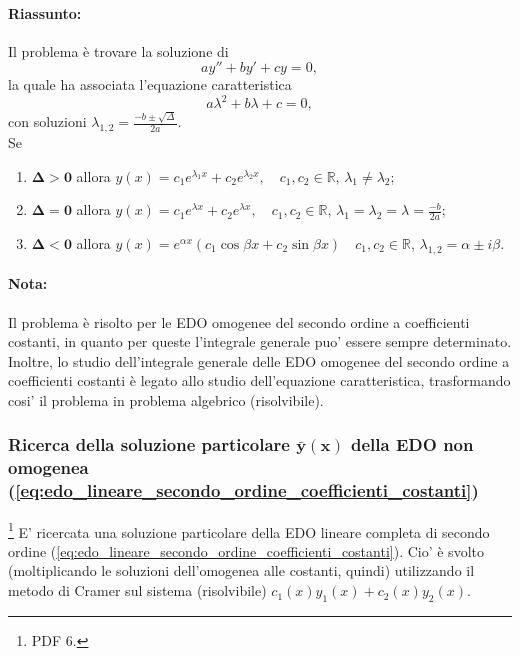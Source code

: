 \paragraph{Riassunto:} Il problema è trovare la soluzione di
\begin{equation*}
	ay'' + b y' + cy = 0,
\end{equation*}
la quale ha associata l'equazione caratteristica
\begin{equation*}
	a\lambda^2 + b\lambda + c = 0,
\end{equation*}
con soluzioni $\lambda_{1,2}=\frac{-b\pm\sqrt{\Delta}}{2a}$.\\
Se
\begin{enumerate}
	\item $\boldsymbol{\Delta>0}$ allora $y(x) = c_1 e^{\lambda_1x} + c_2e^{\lambda_2 x},\quad c_1,c_2\in\mathbb{R},\, \lambda_1 \neq \lambda_2$;
	\item $\boldsymbol{\Delta = 0}$ allora $y(x) = c_1 e^{\lambda x} + c_2e^{\lambda x},\quad c_1,c_2\in\mathbb{R},\, \lambda_1 = \lambda_2=\lambda=\frac{-b}{2a}$;
	\item $\boldsymbol{\Delta<0}$ allora $y(x) = e^{\alpha x}(c_1\cos\beta x + c_2 \sin\beta x)\quad c_1,c_2\in\mathbb{R},\, \lambda_{1,2} = \alpha\pm i\beta$.
\end{enumerate}

\paragraph{Nota:} Il problema è risolto per le EDO omogenee del secondo ordine a coefficienti costanti, in quanto per queste l'integrale generale puo' essere sempre determinato. Inoltre, lo studio dell'integrale generale delle EDO omogenee del secondo ordine a coefficienti costanti è legato allo studio dell'equazione caratteristica, trasformando cosi' il problema in problema algebrico (risolvibile).

\subsubsection{Ricerca della soluzione particolare \texorpdfstring{$\boldsymbol{\bar y(x)}$}{y(x)} della EDO non omogenea (\ref{eq:edo_lineare_secondo_ordine_coefficienti_costanti})}
\footnote{PDF 6.}
E' ricercata una soluzione particolare della EDO lineare completa di secondo ordine (\ref{eq:edo_lineare_secondo_ordine_coefficienti_costanti}). Cio' è svolto (moltiplicando le soluzioni dell'omogenea alle costanti, quindi) utilizzando il metodo di Cramer sul sistema (risolvibile) $c_1(x)y_1(x) + c_2(x)y_2(x)$.

